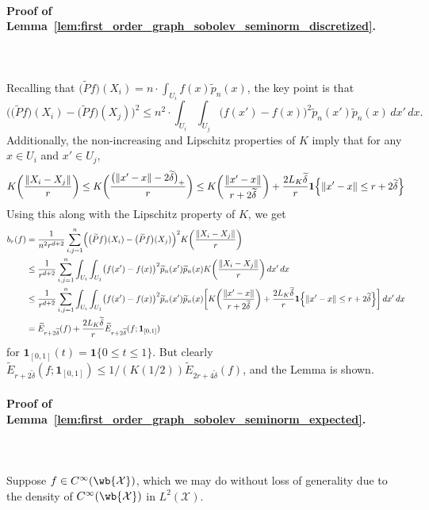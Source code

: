 \documentclass{article}
\newcommand{\1}{\mathbf{1}}
\newcommand{\Xset}{\mathcal{X}}
\newcommand{\Leb}{L}
\newcommand{\wt}[1]{\widetilde{#1}}
\theoremstyle{alden}
\theoremstyle{aldenthm}
\theoremstyle{definition}
\theoremstyle{remark}
\begin{document}
\paragraph{Proof of Lemma~\ref{lem:first_order_graph_sobolev_seminorm_discretized}.} \mbox{} \\
\mbox{} \\
Recalling that $\bigl(\wt{P}f\bigr)(X_i) = n \cdot \int_{U_i} f(x) \wt{p}_n(x)$, the key point is that
\begin{equation*}
\biggl(\bigl(\wt{P}f\bigr)(X_i) - \bigl(\wt{P}f\bigr)(X_j)\biggr)^2 \leq n^2 \cdot \int_{U_i} \int_{U_j} \bigl(f(x') - f(x)\bigr)^2 \wt{p}_n(x') \wt{p}_n(x) \,dx' \,dx.
\end{equation*}
Additionally, the non-increasing and Lipschitz properties of $K$ imply that for any $x \in U_i$ and $x' \in U_j$, 
\begin{equation*}
K\biggl(\frac{\|X_i - X_j\|}{r}\biggr) \leq K\biggl(\frac{\bigl(\|x' - x\| - 2\wt{\delta}\bigr)_{+}}{r}\biggr) \leq K\biggl(\frac{\|x' - x\|}{r + 2\wt{\delta}}\biggr) + \frac{2L_K\wt{\delta}}{r}\1\Bigl\{\|x' - x\| \leq r + 2\wt{\delta}\Bigr\}
\end{equation*}
Using this along with the Lipschitz property of $K$, we get
\begin{align*}
b_r(f) & = \frac{1}{n^2r^{d + 2}} \sum_{i,j = 1}^n \Bigl(\bigl(\wt{P}f\bigr)(X_i) - \bigl(\wt{P}f\bigr)(X_j)\Bigr)^2 K\biggl(\frac{\|X_i - X_j\|}{r}\biggr) \\
& \leq \frac{1}{r^{d + 2}} \sum_{i,j = 1}^n \int_{U_i} \int_{U_j}  \bigl(f(x') - f(x)\bigr)^2 \wt{p}_n(x') \wt{p}_n(x) K\biggl(\frac{\|X_i - X_j\|}{r}\biggr) \,dx' \,dx \\
& \leq \frac{1}{r^{d + 2}} \sum_{i,j = 1}^n \int_{U_i} \int_{U_j}  \bigl(f(x') - f(x)\bigr)^2 \wt{p}_n(x') \wt{p}_n(x) \biggl[K\biggl(\frac{\|x' - x\|}{r + 2\wt{\delta}}\biggr) + \frac{2L_K\wt{\delta}}{r}\1\Bigl\{\|x' - x\| \leq r + 2\wt{\delta}\Bigr\}\biggr] \,dx' \,dx \\
& = \wt{E}_{r + 2\wt{\delta}}(f) + \frac{2L_K\wt{\delta}}{r}\wt{E}_{r + 2\wt{\delta}}(f; \1_{[0,1]})
\end{align*}
for $\1_{[0,1]}(t) = \1\{0 \leq t \leq 1\}$. But clearly $\wt{E}_{r + 2\wt\delta}(f; \1_{[0,1]}) \leq 1/(K(1/2))\wt{E}_{2r + 4\wt{\delta}}(f)$, and the Lemma is shown.

\paragraph{Proof of Lemma~\ref{lem:first_order_graph_sobolev_seminorm_expected}.}
\mbox{}\\
\mbox{}\\
Suppose $f \in C^{\infty}(\wb{\Xset})$, which we may do without loss of generality due to the density of $C^{\infty}(\wb{\Xset})$ in  $\Leb^2(\Xset)$.
\end{document}
